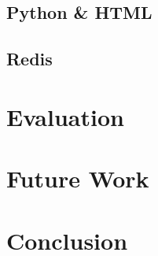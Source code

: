 \documentclass[letterpaper,twocolumn,10pt,draft]{article}
\begin{document}
\subsection{\label{sec:impl:pyhtml}Python \& HTML}

\subsection{\label{sec:impl:redis}Redis}

\section{\label{sec:eval}Evaluation}

\section{\label{sec:fw}Future Work}

\section{\label{sec:con}Conclusion}

%
%
%
%
%

{\footnotesize
    
    }
\end{document}

